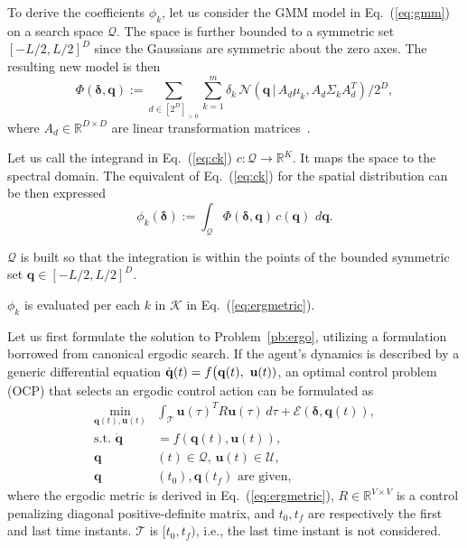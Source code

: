 \documentclass[letterpaper,10pt,conference,twoside]{IEEEtran}
\theoremstyle{definition}
\begin{document}
To derive the coefficients $\phi_k$, let us consider the GMM model in Eq.~(\ref{eq:gmm}) on a search space $\mathcal{Q}$. The space is further bounded to a symmetric set $[-L/2,L/2]^D$ since the Gaussians are symmetric about the zero axes. The resulting new model is then
\begin{equation}
  \Phi(\boldsymbol{\delta},\mathbf{q}):=\sum_{d\in[2^D]_{>0}}\sum_{k=1}^{m}\delta_k\,\mathcal{N}(\mathbf{q}\,|\,A_d\mu_k,A_d\Sigma_k A_d^T)/2^D,
\end{equation}
where $A_d\in\mathbb{R}^{D\times D}$ are linear transformation matrices~\cite{calinon2020mixture}. 

Let us call the integrand in Eq.~(\ref{eq:ck}) $c:\mathcal{Q}\longrightarrow \mathbb{R}^K$. It maps the space to the spectral domain. The equivalent of Eq.~(\ref{eq:ck}) for the spatial distribution can be then expressed
\begin{equation}\label{eq:phik}
  \phi_k(\boldsymbol{\delta}):=\int_{\mathcal{Q}} \Phi(\boldsymbol{\delta},\mathbf{q})\,c(\mathbf{q})\,\,d\mathbf{q}.
\end{equation}

$\mathcal{Q}$ is built so that the integration is within the points of the bounded symmetric set $\mathbf{q}\in[-L/2,L/2]^D$.

$\phi_k$ is evaluated per each $k$ in $\mathcal{K}$ in Eq.~(\ref{eq:ergmetric}).

Let us first formulate the solution to Problem~\ref{pb:ergo}, utilizing a formulation borrowed from canonical ergodic search.
If the agent's dynamics is described by a generic differential equation $\dot{\mathbf{q}}(t)=f\big({\small\mathbf{q}(t),}$ ${\small\mathbf{u}(t)})$, an optimal control problem (OCP) that selects an ergodic control action can be formulated as~\cite{ayvali2017ergodic}
\begin{subequations}\label{eq:ocpergo}\begin{align}
  \min_{\mathbf{q}(t),\mathbf{u}(t)}&\int_{\mathcal{T}}\mathbf{u}(\tau)^TR\mathbf{u}(\tau)\,d\tau+{\mathcal{E}(\boldsymbol{\delta},\mathbf{q}(t))},\label{eq:ocpergomin}\\
  \text{s.t. }\dot{\mathbf{q}}&=f(\mathbf{q}(t),\mathbf{u}(t)),\\
  \mathbf{q}&(t)\in\mathcal{Q},\,\mathbf{u}(t)\in\mathcal{U},\\
  \mathbf{q}&(t_0), \mathbf{q}(t_f)\text{ are given},\label{eq:ocpconsttotf}
\end{align}\end{subequations}
where the ergodic metric is derived in Eq.~(\ref{eq:ergmetric}), $R\in\mathbb{R}^{V\times V}$ is a control penalizing diagonal positive-definite matrix, and $t_0, t_f$ are respectively the first and last time instants. 
$\mathcal{T}$ is $[t_0, t_f)$, i.e., the last time instant is not considered.
\end{document}
